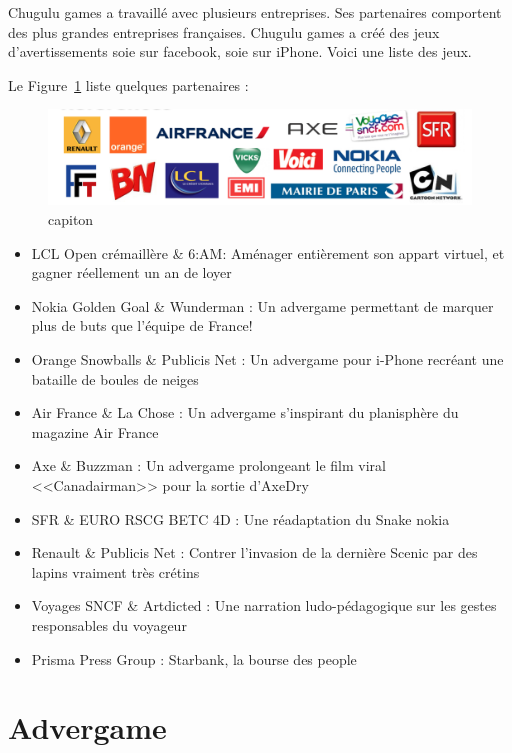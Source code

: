 Chugulu games a travaillé avec plusieurs entreprises. Ses partenaires comportent des plus grandes entreprises françaises. Chugulu games a créé des jeux d'avertissements soie sur facebook, soie sur iPhone. Voici une liste des jeux.

Le Figure~\ref{fig:Image_chugulu_reference} liste quelques partenaires : 


\begin{figure}[htbp]  \centering   \includegraphics[width=6in]{Image/chugulu_reference.png}  \caption{capiton}  \label{fig:Image_chugulu_reference} \end{figure}

\begin{itemize}  \item LCL Open crémaillère \& 6:AM: Aménager entièrement son appart virtuel, et gagner réellement un an de loyer   \item Nokia Golden Goal \& Wunderman : Un advergame permettant de marquer plus de buts que l'équipe de France!

\item Orange Snowballs \& Publicis Net : Un advergame pour i-Phone recréant une bataille de boules de neiges  \item Air France \& La Chose : Un advergame s'inspirant du planisphère du magazine Air France  \item Axe \& Buzzman : Un advergame prolongeant le film viral <<Canadairman>> pour la sortie d'AxeDry  \item SFR \& EURO RSCG BETC 4D : Une réadaptation du Snake nokia   \item Renault \& Publicis Net : Contrer l'invasion de la dernière Scenic par des lapins vraiment très crétins  \item Voyages SNCF \& Artdicted : Une narration ludo-pédagogique sur les gestes responsables du voyageur  \item Prisma Press Group : Starbank, la bourse des people  \end{itemize}


\section{Advergame} %

